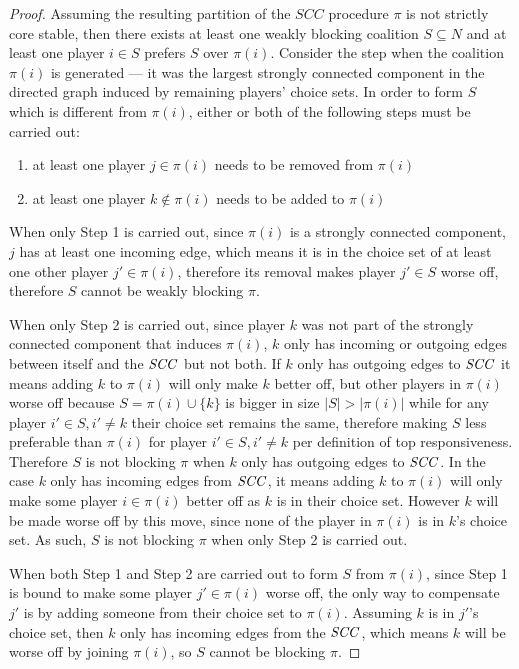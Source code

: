 \begin{proof}
Assuming the resulting partition of the $SCC$ procedure $\pi$ is not strictly core
stable, then there exists at least one weakly blocking coalition $S \subseteq N$
and at least one player $i \in S$ prefers $S$ over $\pi(i)$.
Consider the step when the coalition $\pi(i)$ is generated --- it was the largest
strongly connected component in the directed graph induced by remaining players'
choice sets.
In order to form $S$ which is different from $\pi(i)$, either or both of the
following steps must be carried out:

\begin{enumerate}
  \item at least one player $j \in \pi(i)$ needs to be removed from $\pi(i)$
  \item at least one player $k \notin \pi(i)$ needs to be added to $\pi(i)$
\end{enumerate}

When only Step 1 is carried out, since $\pi(i)$ is a strongly connected component,
$j$ has at least one incoming edge, which means it is in the choice set of at
least one other player $j' \in \pi(i)$, therefore its removal makes player
$j' \in S$ worse off, therefore $S$ cannot be weakly blocking $\pi$.

When only Step 2 is carried out, since player $k$ was not part of the strongly
connected component that induces $\pi(i)$, $k$ only has incoming or outgoing edges
between itself and the $\mathit{SCC}$ but not both.
If $k$ only has outgoing edges to $\mathit{SCC}$ it means adding $k$ to $\pi(i)$ will only
make $k$ better off, but other players in $\pi(i)$ worse off because
$S = \pi(i) \cup \{k\}$ is bigger in size $|S| > |\pi(i)|$ while for any player
$i' \in S, i' \neq k$ their choice set remains the same, therefore making $S$ less
preferable than $\pi(i)$ for player $i' \in S, i' \neq k$ per definition of top
responsiveness.
Therefore $S$ is not blocking $\pi$ when $k$ only has outgoing edges to $\mathit{SCC}$.
In the case $k$ only has incoming edges from $\mathit{SCC}$, it means adding $k$ to
$\pi(i)$ will only make some player $i \in \pi(i)$ better off as $k$ is in their
choice set.
However $k$ will be made worse off by this move, since none of the player in
$\pi(i)$ is in $k$'s choice set.
As such, $S$ is not blocking $\pi$ when only Step 2 is carried out.

When both Step 1 and Step 2 are carried out to form $S$ from $\pi(i)$, since
Step 1 is bound to make some player $j' \in \pi(i)$ worse off, the only way to
compensate $j'$ is by adding someone from their choice set to $\pi(i)$.
Assuming $k$ is in $j'$'s choice set, then $k$ only has incoming edges from the
$\mathit{SCC}$, which means $k$ will be worse off by joining $\pi(i)$, so $S$ cannot be
blocking $\pi$.
\end{proof}

